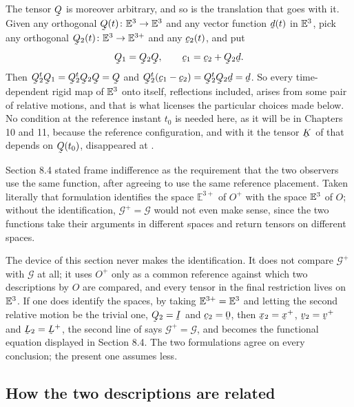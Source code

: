 The tensor $\bQ$ is moreover arbitrary, and so is the translation that
goes with it. Given any orthogonal $\bQ(t)\colon\Vt\to\Vt$ and any
vector function $\bd(t)$ in $\mathbb{E}^{3}$, pick any orthogonal
$\bQ_{2}(t)\colon\Vt\to\mathbb{E}^{3+}$ and any $\bc_{2}(t)$, and put
\[
   \bQ_{1}=\bQ_{2}\bQ,\qquad \bc_{1}=\bc_{2}+\bQ_{2}\bd .
\]
Then $\bQ_{2}^{t}\bQ_{1}=\bQ_{2}^{t}\bQ_{2}\bQ=\bQ$ and
$\bQ_{2}^{t}(\bc_{1}-\bc_{2})=\bQ_{2}^{t}\bQ_{2}\bd=\bd$. So every
time-dependent rigid map of $\mathbb{E}^{3}$ onto itself, reflections included,
arises from some pair of relative motions, and that is what licenses the
particular choices made below. No condition at the reference instant
$t_{0}$ is needed here, as it will be in Chapters 10 and 11, because the
reference configuration, and with it the tensor $\bK$ of 
that depends on $\bQ(t_{0})$, disappeared at .

\begin{remark}\label{rem:ch9defn}
Section 8.4 stated frame indifference as the requirement that the two
observers use the same function, after agreeing to use the same
reference placement. Taken literally that formulation identifies the
space $\mathbb{E}^{3+}$ of $O^{+}$ with the space $\mathbb{E}^{3}$ of $O$; without
the identification, $\mathcal{G}^{+}=\mathcal{G}$ would not even make
sense, since the two functions take their arguments in different spaces
and return tensors on different spaces.

The device of this section never makes the identification. It does not
compare $\mathcal{G}^{+}$ with $\mathcal{G}$ at all; it uses $O^{+}$
only as a common reference against which two descriptions by $O$ are
compared, and every tensor in the final restriction  lives on
$\mathbb{E}^{3}$. If one does identify the spaces, by taking
$\mathbb{E}^{3+}=\mathbb{E}^{3}$ and letting the second relative motion be the
trivial one, $\bQ_{2}=\I$ and $\bc_{2}=\bze$, then $\bx_{2}=\bx^{+}$,
$\bv_{2}=\bv^{+}$ and $\bL_{2}=\bL^{+}$, the second line of 
says $\mathcal{G}^{+}=\mathcal{G}$, and  becomes the
functional equation displayed in Section 8.4. The two formulations
agree on every conclusion; the present one assumes less.
\end{remark}

\subsection*{How the two descriptions are related}

